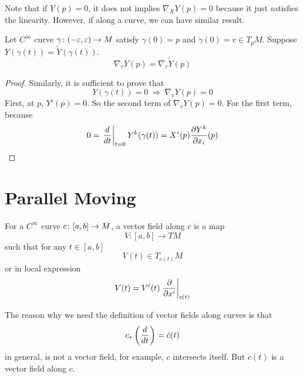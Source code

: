 \noindent Note that if $Y(p) = 0$, it does not implies $\nabla_XY(p) = 0$ because it just satisfies the linearity. However, if along a curve, we can have similar result.
\begin{prop}
	Let $C^\infty$ curve $\gamma \colon (-\varepsilon,\varepsilon) \rightarrow M$ satisfy $\gamma(0) = p$ and $\dot{\gamma}(0) = v \in T_pM$. Suppose $Y(\gamma(t)) = \tilde{Y}(\gamma(t))$.
	\begin{equation*}
	 	\nabla_vY(p) = \nabla_v\tilde{Y}(p)
	\end{equation*} 
\end{prop}
\begin{proof}
	Similarly, it is sufficient to prove that
	\begin{equation*}
		Y(\gamma(t)) = 0 ~\Rightarrow~ \nabla_vY(p) = 0
	\end{equation*}
	First, at $p$, $Y^i(p) = 0$. So the second term of $\nabla_vY(p) = 0$. For the first term, because
	\begin{equation*}
		0 = \left.\frac{d}{dt}\right\lvert_{t=0}Y^k(\gamma(t)) = X^i(p)\frac{\partial Y^k}{\partial x_i}(p) \qedhere
	\end{equation*}
\end{proof}

\section{Parallel Moving}

For a $C^\infty$ curve $c \colon [a,b] \rightarrow M$, a vector field along $c$ is a map
\begin{equation*}
	V \colon [a,b] \longrightarrow TM
\end{equation*}
such that for any $t \in [a,b]$
\begin{equation*}
	V(t) \in T_{c(t)}M
\end{equation*}
or in local expression
\begin{equation*}
	V(t) = V^i(t) \left.\frac{\partial}{\partial x^i}\right\lvert_{c(t)}
\end{equation*}
\begin{rmk}
	The reason why we need the definition of vector fields along curves is that
	\begin{equation*}
		c_*\left(\frac{d}{dt}\right) = \dot{c}(t)
	\end{equation*}
	in general, is not a vector field, for example, $c$ intersects itself. But $\dot{c}(t)$ is a vector field along $c$.
\end{rmk}


